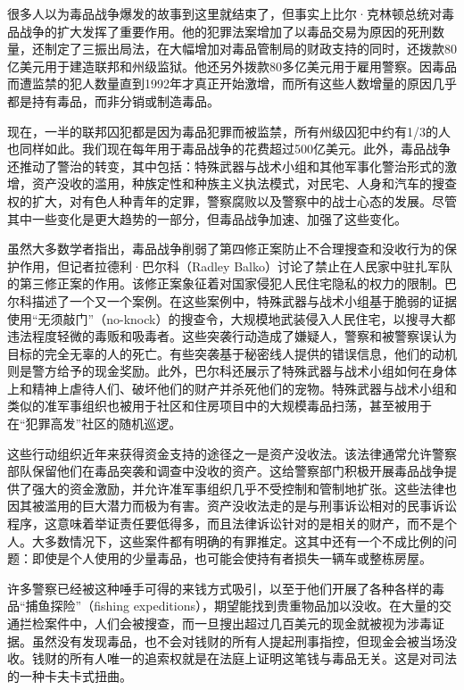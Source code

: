 \documentclass[fontset=fandol, a4paper, 12pt, openright]{ctexbook}
\begin{document}
很多人以为毒品战争爆发的故事到这里就结束了，但事实上比尔·克林顿总统对毒品战争的扩大发挥了重要作用。他的犯罪法案增加了以毒品交易为原因的死刑数量，还制定了三振出局法，在大幅增加对毒品管制局的财政支持的同时，还拨款80亿美元用于建造联邦和州级监狱。他还另外拨款80多亿美元用于雇用警察。因毒品而遭监禁的犯人数量直到1992年才真正开始激增，而所有这些人数增量的原因几乎都是持有毒品，而非分销或制造毒品。

现在，一半的联邦囚犯都是因为毒品犯罪而被监禁，所有州级囚犯中约有1/3的人也同样如此。我们现在每年用于毒品战争的花费超过500亿美元。此外，毒品战争还推动了警治的转变，其中包括：特殊武器与战术小组和其他军事化警治形式的激增，资产没收的滥用，种族定性和种族主义执法模式，对民宅、人身和汽车的搜查权的扩大，对有色人种青年的定罪，警察腐败以及警察中的战士心态的发展。尽管其中一些变化是更大趋势的一部分，但毒品战争加速、加强了这些变化。

虽然大多数学者指出，毒品战争削弱了第四修正案防止不合理搜查和没收行为的保护作用，但记者拉德利·巴尔科（Radley Balko）讨论了禁止在人民家中驻扎军队的第三修正案的作用。该修正案象征着对国家侵犯人民住宅隐私的权力的限制。巴尔科描述了一个又一个案例。在这些案例中，特殊武器与战术小组基于脆弱的证据使用“无须敲门”（no-knock）的搜查令，大规模地武装侵入人民住宅，以搜寻大都违法程度轻微的毒贩和吸毒者。这些突袭行动造成了嫌疑人，警察和被警察误认为目标的完全无辜的人的死亡。有些突袭基于秘密线人提供的错误信息，他们的动机则是警方给予的现金奖励。此外，巴尔科还展示了特殊武器与战术小组如何在身体上和精神上虐待人们、破坏他们的财产并杀死他们的宠物。特殊武器与战术小组和类似的准军事组织也被用于社区和住房项目中的大规模毒品扫荡，甚至被用于在“犯罪高发”社区的随机巡逻。

这些行动组织近年来获得资金支持的途径之一是资产没收法。该法律通常允许警察部队保留他们在毒品突袭和调查中没收的资产。这给警察部门积极开展毒品战争提供了强大的资金激励，并允许准军事组织几乎不受控制和管制地扩张。这些法律也因其被滥用的巨大潜力而极为有害。资产没收法走的是与刑事诉讼相对的民事诉讼程序，这意味着举证责任要低得多，而且法律诉讼针对的是相关的财产，而不是个人。大多数情况下，这些案件都有明确的有罪推定。这其中还有一个不成比例的问题：即使是个人使用的少量毒品，也可能会使持有者损失一辆车或整栋房屋。

许多警察已经被这种唾手可得的来钱方式吸引，以至于他们开展了各种各样的毒品“捕鱼探险”（fishing expeditions），期望能找到贵重物品加以没收。在大量的交通拦检案件中，人们会被搜查，而一旦搜出超过几百美元的现金就被视为涉毒证据。虽然没有发现毒品，也不会对钱财的所有人提起刑事指控，但现金会被当场没收。钱财的所有人唯一的追索权就是在法庭上证明这笔钱与毒品无关。这是对司法的一种卡夫卡式扭曲。
\end{document}
